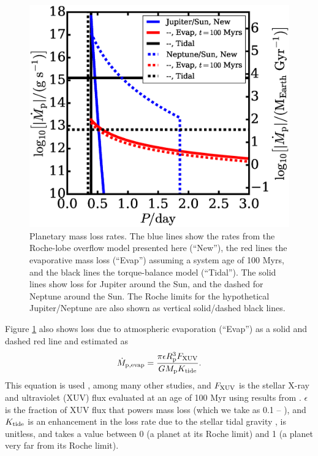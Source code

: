\documentclass{aastex}
\begin{document}
\begin{figure}
\includegraphics[width=\textwidth]{Mdot_map}
\caption{Planetary mass loss rates. The blue lines show the rates from the Roche-lobe overflow model presented here (``New''), the red lines the evaporative mass loss (``Evap'') \citep[e.g.][]{2012ApJ...761...59L} assuming a system age of 100 Myrs, and the black lines the torque-balance model (``Tidal''). The solid lines show loss for Jupiter around the Sun, and the dashed for Neptune around the Sun. The Roche limits for the hypothetical Jupiter/Neptune are also shown as vertical solid/dashed black lines.}
\label{fig:Mdot_map}
\end{figure}

Figure \ref{fig:Mdot_map} also shows loss due to atmospheric evaporation (``Evap'') as a solid and dashed red line and estimated as 
\begin{equation}
\dot{M}_{\rm p, evap} = \frac{\pi \epsilon R_{\rm p}^3 F_{\rm XUV}}{G M_{\rm p} K_{\rm tide}}.
\end{equation}
This equation is used \citet{2012ApJ...761...59L}, among many other studies, and $F_{\rm XUV}$ is the stellar X-ray and ultraviolet (XUV) flux evaluated at an age of 100 Myr using results from \citet{2005ApJ...622..680R}. $\epsilon$ is the fraction of XUV flux that powers mass loss (which we take as 0.1 -- \citealp{2012ApJ...761...59L}), and $K_{\rm tide}$ is an enhancement in the loss rate due to the stellar tidal gravity \citep{2007A&A...472..329E}, is unitless, and takes a value between 0 (a planet at its Roche limit) and 1 (a planet very far from its Roche limit). 
\end{document}
